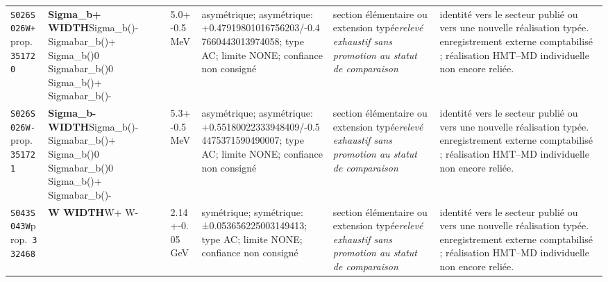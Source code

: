 \begin{landscape}
\begin{longtable}{L{1.85cm}L{4.45cm}L{2.35cm}L{4.05cm}L{3.35cm}L{7.15cm}}
\texttt{S026}\newline \texttt{S026W+}\newline prop.\ \texttt{351720} & \textbf{Sigma\_\allowbreak{}b+ WIDTH}\newline Sigma\_\allowbreak{}b()- \textbar{}\allowbreak{} Sigmabar\_\allowbreak{}b()+ \textbar{}\allowbreak{} Sigma\_\allowbreak{}b()0 \textbar{}\allowbreak{} Sigmabar\_\allowbreak{}b()0 \textbar{}\allowbreak{} Sigma\_\allowbreak{}b()+ \textbar{}\allowbreak{} Sigmabar\_\allowbreak{}b()- & 5.0+-0.5\,MeV & asymétrique; asymétrique: +0.47919801016756203/-0.47660443013974058; type AC; limite NONE; confiance non consigné & section élémentaire ou extension typée\newline \emph{relevé exhaustif sans promotion au statut de comparaison} & identité vers le secteur publié ou vers une nouvelle réalisation typée. enregistrement externe comptabilisé ; réalisation HMT--MD individuelle non encore reliée. \\
\texttt{S026}\newline \texttt{S026W-}\newline prop.\ \texttt{351721} & \textbf{Sigma\_\allowbreak{}b- WIDTH}\newline Sigma\_\allowbreak{}b()- \textbar{}\allowbreak{} Sigmabar\_\allowbreak{}b()+ \textbar{}\allowbreak{} Sigma\_\allowbreak{}b()0 \textbar{}\allowbreak{} Sigmabar\_\allowbreak{}b()0 \textbar{}\allowbreak{} Sigma\_\allowbreak{}b()+ \textbar{}\allowbreak{} Sigmabar\_\allowbreak{}b()- & 5.3+-0.5\,MeV & asymétrique; asymétrique: +0.55180022333948409/-0.54475371590490007; type AC; limite NONE; confiance non consigné & section élémentaire ou extension typée\newline \emph{relevé exhaustif sans promotion au statut de comparaison} & identité vers le secteur publié ou vers une nouvelle réalisation typée. enregistrement externe comptabilisé ; réalisation HMT--MD individuelle non encore reliée. \\
\texttt{S043}\newline \texttt{S043W}\newline prop.\ \texttt{332468} & \textbf{W WIDTH}\newline W+ \textbar{}\allowbreak{} W- & 2.14+-0.05\,GeV & symétrique; symétrique: ±0.053656225003149413; type AC; limite NONE; confiance non consigné & section élémentaire ou extension typée\newline \emph{relevé exhaustif sans promotion au statut de comparaison} & identité vers le secteur publié ou vers une nouvelle réalisation typée. enregistrement externe comptabilisé ; réalisation HMT--MD individuelle non encore reliée. \\

\end{longtable}
\end{landscape}
